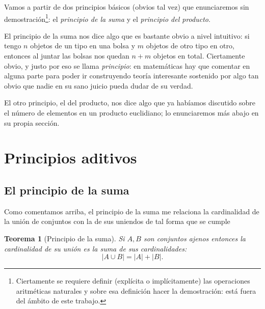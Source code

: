 \documentclass{book}
\newtheorem{thm}{Teorema}[chapter]
\theoremstyle{definition}
\begin{document}
Vamos a partir de dos principios básicos (obvios tal vez) que enunciaremos sin demostración\footnote{Ciertamente se requiere definir (explícita o implícitamente) las operaciones aritméticas naturales y sobre esa definición hacer la demostración: está fuera del ámbito de este trabajo.}: el \emph{principio de la suma} y el \emph{principio del producto}.

El principio de la suma nos dice algo que es bastante obvio a nivel intuitivo: si tengo $n$ objetos de un tipo en una bolsa y $m$ objetos de otro tipo en otro, entonces al juntar las bolsas nos quedan $n+m$ objetos en total.
Ciertamente obvio, y justo por eso se llama \emph{principio}: en matemáticas hay que comentar en alguna parte para poder ir construyendo teoría interesante sostenido por algo tan obvio que nadie en su sano juicio pueda dudar de su verdad.

El otro principio, el del producto, nos dice algo que ya habíamos discutido %
sobre el número de elementos en un producto euclidiano; lo enunciaremos más abajo en su propia sección.

\section{Principios aditivos}
\subsection{El principio de la suma}
Como comentamos arriba, el principio de la suma me relaciona la cardinalidad de la unión de conjuntos con la de sus uniendos de tal forma que se cumple
\begin{thm}[Principio de la suma]
	Si $A,B$ son conjuntos ajenos %
	entonces la cardinalidad de su unión es la suma de sus cardinalidades:
	\[\left|A\cup B\right| = \left| A \right| +\left| B \right|.\]
\end{thm}
\end{document}
